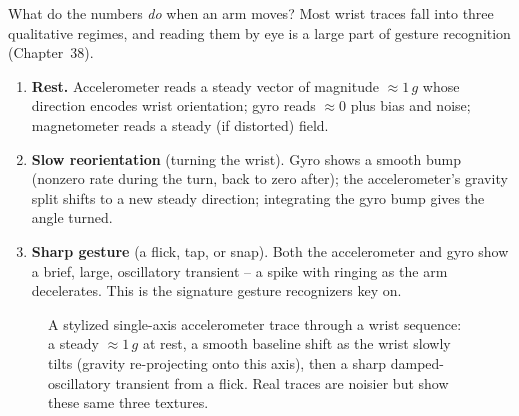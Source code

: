 What do the numbers \emph{do} when an arm moves? Most wrist traces fall into three
qualitative regimes, and reading them by eye is a large part of gesture recognition
(Chapter~38).

\begin{enumerate}
\item \textbf{Rest.} Accelerometer reads a steady vector of magnitude $\approx 1\,g$
  whose direction encodes wrist orientation; gyro reads $\approx 0$ plus bias and
  noise; magnetometer reads a steady (if distorted) field.
\item \textbf{Slow reorientation} (turning the wrist). Gyro shows a smooth bump
  (nonzero rate during the turn, back to zero after); the accelerometer's gravity
  split shifts to a new steady direction; integrating the gyro bump gives the angle
  turned.
\item \textbf{Sharp gesture} (a flick, tap, or snap). Both the accelerometer and gyro
  show a brief, large, oscillatory transient -- a spike with ringing as the arm
  decelerates. This is the signature gesture recognizers key on.
\end{enumerate}

\begin{figure}[H]
\centering
{}
\caption{A stylized single-axis accelerometer trace through a wrist sequence: a steady
$\approx 1\,g$ at rest, a smooth baseline shift as the wrist slowly tilts (gravity
re-projecting onto this axis), then a sharp damped-oscillatory transient from a flick.
Real traces are noisier but show these same three textures.}
\label{ch34:fig-wrist-accel}
\end{figure}

